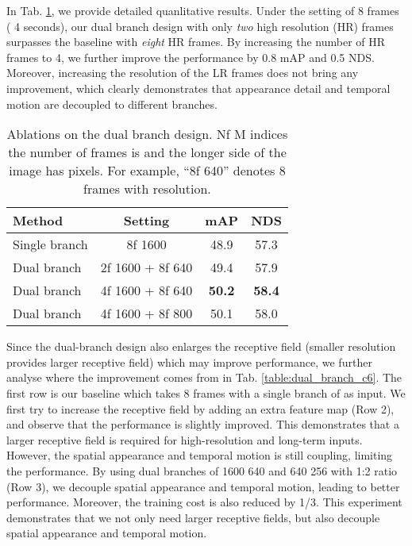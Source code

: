 \documentclass[10pt,twocolumn,letterpaper]{article}
\begin{document}
In Tab. \ref{table:dual_branch}, we provide detailed quanlitative results. Under the setting of 8 frames ( 4 seconds), our dual branch design with only \textit{two} high resolution (HR) frames surpasses the baseline with \textit{eight} HR frames. By increasing the number of HR frames to 4, we further improve the performance by 0.8 mAP and 0.5 NDS. Moreover, increasing the resolution of the LR frames does not bring any improvement, which clearly demonstrates that appearance detail and temporal motion are decoupled to different branches.

\begin{table}[t]
  \centering
  \begin{tabular}{l|c|cc}
    \toprule
    Method & Setting & mAP & NDS \\
    \midrule
    Single branch & 8f  1600 & 48.9 & 57.3 \\
    Dual branch & 2f  1600 + 8f  640 & 49.4 & 57.9 \\
    Dual branch & 4f  1600 + 8f  640 & \textbf{50.2} & \textbf{58.4} \\
    Dual branch & 4f  1600 + 8f  800 & 50.1 & 58.0 \\
    \bottomrule
  \end{tabular}
  \caption{Ablations on the dual branch design. Nf  M indices the number of frames is  and the longer side of the image has  pixels. For example, ``8f  640'' denotes 8 frames with  resolution.}
  \label{table:dual_branch}
\end{table}

Since the dual-branch design also enlarges the receptive field (smaller resolution provides larger receptive field) which may improve performance, we further analyse where the improvement comes from in Tab. \ref{table:dual_branch_c6}. The first row is our baseline which takes 8 frames with a single branch of  as input. We first try to increase the receptive field by adding an extra  feature map (Row 2), and observe that the performance is slightly improved. This demonstrates that a larger receptive field is required for high-resolution and long-term inputs. However, the spatial appearance and temporal motion is still coupling, limiting the performance. By using dual branches of 1600  640 and 640  256 with 1:2 ratio (Row 3), we decouple spatial appearance and temporal motion, leading to better performance. Moreover, the training cost is also reduced by 1/3. This experiment demonstrates that we not only need larger receptive fields, but also decouple spatial appearance and temporal motion.
\end{document}
